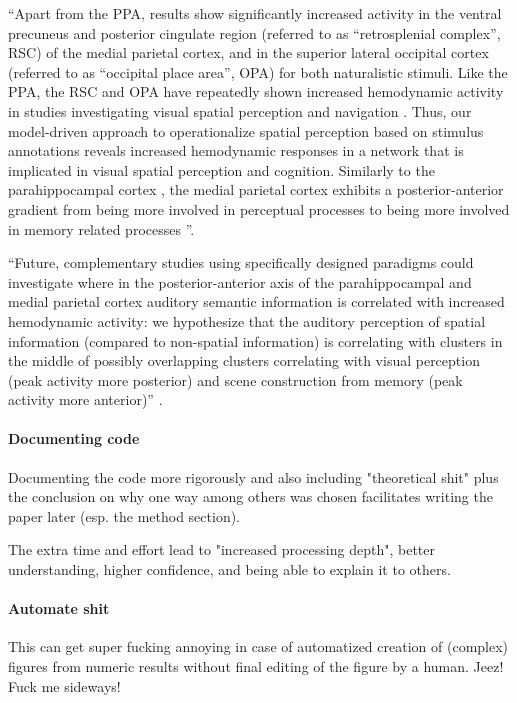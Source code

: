 ``Apart from the PPA, results show significantly increased activity in the
ventral precuneus and posterior cingulate region (referred to as ``retrosplenial
complex'', RSC) of the medial parietal cortex, and in the superior lateral
occipital cortex (referred to as ``occipital place area'', OPA) for both
naturalistic stimuli.
Like the PPA, the RSC and OPA have repeatedly shown increased hemodynamic
activity in studies investigating visual spatial perception and navigation
\citep{chrastil2018heterogeneity, bettencourt2013role, dilks2013occipital,
epstein2019scene}.
Thus, our model-driven approach to operationalize spatial perception based on
stimulus annotations reveals increased hemodynamic responses in a network that
is implicated in visual spatial perception and cognition.
Similarly to the parahippocampal cortex \citep{aminoff2013role}, the medial
parietal cortex exhibits a posterior-anterior gradient from being more involved
in perceptual processes to being more involved in memory related processes
\citep{chrastil2018heterogeneity, hassabis2009construction, silson2019posterior,
steel2021network}''.

``Future, complementary studies using specifically designed paradigms could
investigate where in the posterior-anterior axis of the parahippocampal and
medial parietal cortex auditory semantic information is correlated with
increased hemodynamic activity:
we hypothesize that the auditory perception of spatial information (compared to
non-spatial information) is correlating with clusters in the middle of possibly
overlapping clusters correlating with visual perception (peak activity more
posterior) and scene construction from memory (peak activity more anterior)''
\citep{haeusler2022processing}.


\paragraph{Documenting code}
%
Documenting the code more rigorously and also including "theoretical shit" plus
the conclusion on why one way among others was chosen facilitates writing the
paper later (esp. the method section).

%
The extra time and effort lead to "increased processing depth", better
understanding, higher confidence, and being able to explain it to others.


\paragraph{Automate shit}
%
This can get super fucking annoying in case of automatized creation of (complex)
figures from numeric results without final editing of the figure by a human.
Jeez! Fuck me sideways!

